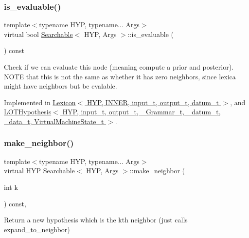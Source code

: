 \subsubsection{\texorpdfstring{is\+\_\+evaluable()}{is\_evaluable()}}
{\footnotesize\ttfamily template$<$typename H\+YP, typename... Args$>$ \\
virtual bool \hyperlink{class_searchable}{Searchable}$<$ H\+YP, Args $>$\+::is\+\_\+evaluable (\begin{DoxyParamCaption}{ }\end{DoxyParamCaption}) const\hspace{0.3cm}{\ttfamily [pure virtual]}}



Check if we can evaluate this node (meaning compute a prior and posterior). N\+O\+TE that this is not the same as whether it has zero neighbors, since lexica might have neighbors but be evalable. 



Implemented in \hyperlink{class_lexicon_ab9fcefbd8598a5401a39bd59e8043db9}{Lexicon$<$ H\+Y\+P, I\+N\+N\+E\+R, input\+\_\+t, output\+\_\+t, datum\+\_\+t $>$}, and \hyperlink{class_l_o_t_hypothesis_a9eeaaf321324d2418405f4d7252f6ca4}{L\+O\+T\+Hypothesis$<$ H\+Y\+P, input\+\_\+t, output\+\_\+t, \+\_\+\+Grammar\+\_\+t, \+\_\+datum\+\_\+t, \+\_\+data\+\_\+t, Virtual\+Machine\+State\+\_\+t $>$}.

\mbox{\label{class_searchable_acd4cf198859084f7a656ef507e65a872}} 
\subsubsection{\texorpdfstring{make\+\_\+neighbor()}{make\_neighbor()}}
{\footnotesize\ttfamily template$<$typename H\+YP, typename... Args$>$ \\
virtual H\+YP \hyperlink{class_searchable}{Searchable}$<$ H\+YP, Args $>$\+::make\+\_\+neighbor (\begin{DoxyParamCaption}\item[{int}]{k }\end{DoxyParamCaption}) const\hspace{0.3cm}{\ttfamily [inline]}, {\ttfamily [virtual]}}



Return a new hypothesis which is the k\textquotesingle{}th neighbor (just calls expand\+\_\+to\+\_\+neighbor) 


